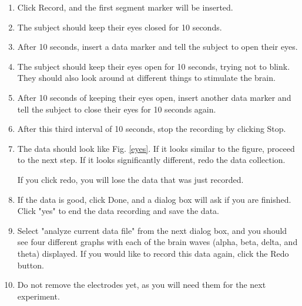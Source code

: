 \documentclass{article}
\begin{document}
\begin{enumerate}
	\item Click Record, and the first segment marker will be inserted.
	\item The subject should keep their eyes closed for 10 seconds.
	\item After 10 seconds, insert a data marker and tell the subject to open their eyes.
	\item The subject should keep their eyes open for 10 seconds, trying not to blink. They should also look around at different things to stimulate the brain.
	\item After 10 seconds of keeping their eyes open, insert another data marker and tell the subject to close their eyes for 10 seconds again.
	\item After this third interval of 10 seconds, stop the recording by clicking Stop.
	\item The data should look like Fig. \ref{eyes}. If it looks similar to the figure, proceed to the next step. If it looks significantly different, redo the data collection.
	\begin{warn}
		If you click redo, you will lose the data that was just recorded.
	\end{warn}
	
	\item If the data is good, click Done, and a dialog box will ask if you are finished. Click "yes" to end the data recording and save the data.
	\item Select "analyze current data file" from the next dialog box, and you should see four different graphs with each of the brain waves (alpha, beta, delta, and theta) displayed. If you would like to record this data again, click the Redo button.
	\item Do not remove the electrodes yet, as you will need them for the next experiment.
\end{enumerate}
\end{document}

